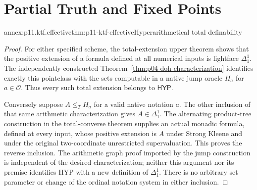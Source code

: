 \section{Partial Truth and Fixed Points}
\label{sec:p11-ktf-proofs}

\begin{annexitem}{annex:p11.ktf.effective}{thm:p11-ktf-effective}{Hyperarithmetical total definability}
\begin{proof}
For either specified scheme, the total-extension upper theorem shows
that the positive extension of a formula defined at all numerical
inputs is lightface \(\Delta^1_1\). The independently constructed
Theorem~\ref{thm:p04-doh-characterization} identifies exactly this
pointclass with the sets computable in a native jump oracle \(H_a\)
for \(a\in\mathcal O\). Thus every such total extension belongs
to \(\mathsf{HYP}\).

Conversely suppose \(A\leq_T H_a\) for a valid native notation
\(a\). The other inclusion of that same arithmetic characterization
gives \(A\in\Delta^1_1\). The alternating product-tree
construction in the total-converse theorem supplies an actual
monadic formula, defined at every input, whose positive extension
is \(A\) under Strong Kleene and under the original two-coordinate
unrestricted supervaluation. This proves the reverse inclusion.
The arithmetic graph proof imported by the jump construction is
independent of the desired characterization; neither this argument
nor its premise identifies HYP with a new definition of \(\Delta^1_1\).
There is no arbitrary set parameter or change of the ordinal
notation system in either inclusion.
\end{proof}
\end{annexitem}

